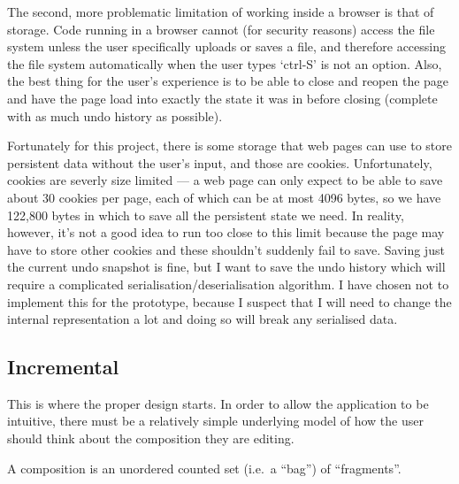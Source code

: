 \documentclass[12pt]{article}
\newcommand{\br}[0]{\vspace{10pt} \noindent}
\begin{document}
\br{}The second, more problematic limitation of working inside a browser is that of storage.
Code running in a browser cannot (for security reasons) access the file system unless the user
specifically uploads or saves a file, and therefore accessing the file system automatically when the
user types `ctrl-S' is not an option.  Also, the best thing for the user's experience is to be able
to close and reopen the page and have the page load into exactly the state it was in before closing
(complete with as much undo history as possible).

Fortunately for this project, there is some storage that web pages can use to store persistent data
without the user's input, and those are cookies.  Unfortunately, cookies are severly size limited
--- a web page can only expect to be able to save about 30 cookies per page, each of which can be at
most 4096 bytes, so we have 122,800 bytes in which to save all the persistent state we need.  In
reality, however, it's not a good idea to run too close to this limit because the page may have to
store other cookies and these shouldn't suddenly fail to save.  Saving just the current undo
snapshot is fine, but I want to save the undo history which will require a complicated
serialisation/deserialisation algorithm.  I have chosen not to implement this for the prototype,
because I suspect that I will need to change the internal representation a lot and doing so will
break any serialised data.

\subsection{Incremental}

This is where the proper design starts.  In order to allow the application to be intuitive, there
must be a relatively simple underlying model of how the user should think about the composition they
are editing.

A composition is an unordered counted set (i.e.\ a ``bag'') of ``fragments''.
\end{document}
